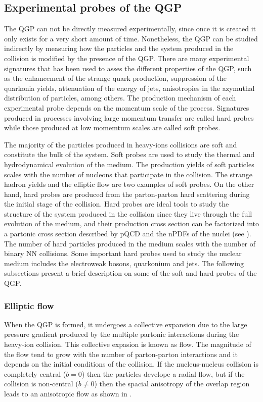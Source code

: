 \subsection{Experimental probes of the QGP}

The QGP can not be directly measured experimentally, since once it is created it only exists for a very short amount of time. Nonetheless, the QGP can be studied indirectly by measuring how the particles and the system produced in the collision is modified by the presence of the QGP. There are many experimental signatures that has been used to asses the different properties of the QGP, such as the enhancement of the strange quark production, suppression of the quarkonia yields, attenuation of the energy of jets, anisotropies in the azymuthal distribution of particles, among others. The production mechanism of each experimental probe depends on the momentum scale of the process. Signatures produced in processes involving large momentum transfer are called hard probes while those produced at low momemtum scales are called soft probes.

The majority of the particles produced in heavy-ions collisions are soft and constitute the bulk of the system. Soft probes are used to study the thermal and hydrodynamical evolution of the medium. The production yields of soft particles scales with the number of nucleons that participate in the collision. The strange hadron yields and the elliptic flow are two examples of soft probes. On the other hand, hard probes are produced from the parton-parton hard scattering during the initial stage of the collision. Hard probes are ideal tools to study the structure of the system produced in the collision  since they live through the full evolution of the medium, and their production cross section can be factorized into a partonic cross section described by pQCD and the nPDFs of the nuclei (see ). The number of hard particles produced in the medium  scales with the number of binary NN collisions. Some important hard probes used to study the nuclear medium includes the electroweak bosons, quarkonium and jets. The following subsections present a brief description on some of the soft and hard probes of the QGP.


\subsubsection{Elliptic flow}

When the QGP is formed, it undergoes a collective expansion due to the large pressure gradient produced by the multiple partonic interactions during the heavy-ion collision. This collective expasion is known as flow. The magnitude of the flow tend to grow with the number of parton-parton interactions and it depends on the initial conditions of the collision. If the nucleus-nucleus collision is completely central ($b = 0$) then the particles develope a radial flow, but if the collision is non-central ($b \neq 0$) then the spacial anisotropy of the overlap region leads to an anisotropic flow as shown in .

